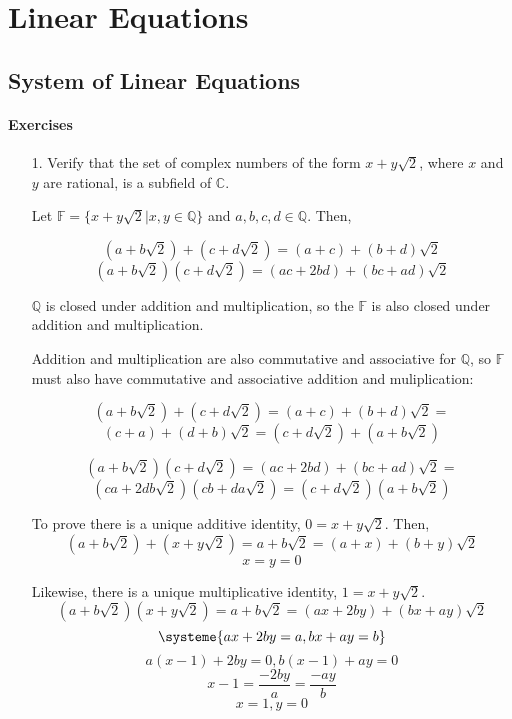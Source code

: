\documentclass{article}
\begin{document}
\section{Linear Equations}

\setcounter{subsection}{1}
\subsection{System of Linear Equations}

\paragraph{Exercises}
\begin{enumerate}[listparindent=\parindent]
\item[1.] Verify that the set of complex numbers of the form \(x + y\sqrt{2}\), where \(x\) and \(y\) are rational, is a subfield of \(\mathbb{C}\).

    Let \(\mathbb F = \{x + y\sqrt{2} | x, y \in \mathbb Q\}\) and \(a, b, c, d \in \mathbb Q\). Then,

    \[(a + b\sqrt{2}) + (c + d\sqrt{2}) = (a + c) + (b + d)\sqrt{2}\]
    \[(a + b\sqrt{2})(c + d\sqrt{2}) = (ac + 2bd) + (bc + ad)\sqrt{2}\]

    \(\mathbb Q\) is closed under addition and multiplication,
    so the \(\mathbb F\) is also closed under addition and multiplication.

    Addition and multiplication are also commutative and associative for \(\mathbb Q\),
    so \(\mathbb F\) must also have commutative and associative addition and muliplication:

    \[(a + b\sqrt{2}) + (c + d\sqrt{2}) = (a + c) + (b + d)\sqrt{2} = \]
    \[(c + a) + (d + b)\sqrt{2} = (c + d\sqrt{2}) + (a + b\sqrt{2})\]

    \[(a + b\sqrt{2})(c + d\sqrt{2}) = (ac + 2bd) + (bc + ad)\sqrt{2} = \]
    \[(ca + 2db\sqrt{2})(cb + da\sqrt{2}) = (c + d\sqrt{2})(a + b\sqrt{2})\]

    To prove there is a unique additive identity, \(0 = x + y\sqrt{2}\). Then,
    \[(a + b\sqrt{2}) + (x + y\sqrt{2}) = a + b\sqrt{2} = (a + x) + (b + y)\sqrt{2}\]
    \[x = y = 0\]

    Likewise, there is a unique multiplicative identity, \(1 = x + y\sqrt{2}\).
    \[(a + b\sqrt{2})(x + y\sqrt{2}) = a + b\sqrt{2} = (ax + 2by) + (bx + ay)\sqrt{2}\]
    \[
        \systeme{
            ax + 2by = a,
            bx + ay = b
        }
    \]
    \[a(x - 1) + 2by = 0, b(x - 1) + ay = 0\]
    \[x - 1 = \frac{-2by}{a} = \frac{-ay}{b}\]
    \[x = 1, y = 0\]


\end{enumerate}
\end{document}

